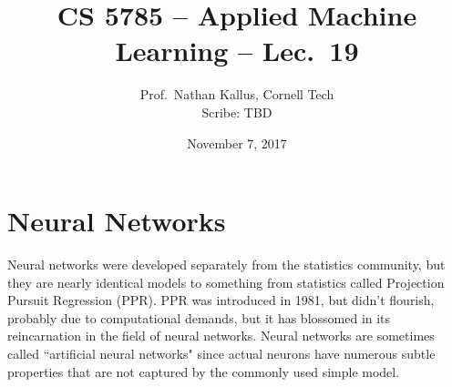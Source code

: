 \documentclass[a4paper]{article}
\title{CS 5785 -- Applied Machine Learning -- Lec.\ 19}
\author{Prof.\ Nathan Kallus, Cornell Tech\\Scribe: TBD}
\date{November 7, 2017}
\begin{document}
\maketitle

\section{Neural Networks}
Neural networks were developed separately from the statistics community, but they are nearly identical models to something from statistics called Projection Pursuit Regression (PPR). PPR was introduced in 1981, but didn't flourish, probably due to computational demands, but it has blossomed in its reincarnation in the field of neural networks. Neural networks are sometimes called ``artificial neural networks" since actual neurons have numerous subtle properties that are not captured by the commonly used simple model.
\end{document}
